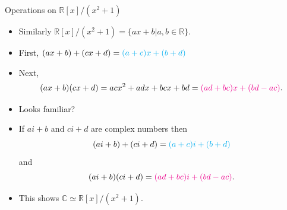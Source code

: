 \documentclass[ %
usenames,dvipsnames,
aspectratio=169,11pt]{beamer}
\newenvironment{stepitemize}{\begin{itemize}[<+->]}{\end{itemize} }
\newcommand{\R}{\mathbb{R}}
\newcommand{\C}{\mathbb{C}}
\begin{document}
\begin{frame}{Operations on $\R[x]/(x^2+1)$}
    \begin{stepitemize}
\item Similarly $\R[x]/(x^2+1) = \{ax+b| a,b\in \R\}$.
\item First, $(ax+b)+(cx+d)={\color{cyan}(a+c)x+(b+d)}$
    \item Next, 
    $$(ax+b)(cx+d) = acx^2+adx+bcx+bd = {\color{magenta}(ad+bc)x+(bd-ac)}.$$
    \item Looks familiar?
    \item If $ai+b$ and $ci+d$ are complex numbers then
    $$(ai+b)+(ci+d) = {\color{cyan}(a+c)i+(b+d)}$$
    and 
   $$ (ai+b)(ci+d) = {\color{magenta}(ad+bc)i+(bd-ac)}.$$
\item This shows $\C \simeq \R[x]/(x^2+1)$. 
    \end{stepitemize}
\end{frame}
\end{document}
